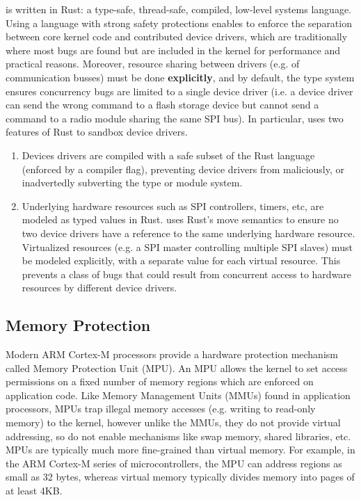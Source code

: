 \name is written in Rust: a type-safe, thread-safe, compiled, low-level systems
language. Using a language with strong safety protections enables \name to
enforce the separation between core kernel code and contributed device
drivers, which are traditionally where most bugs are found but are included in
the kernel for performance and practical reasons. Moreover, resource sharing
between drivers (e.g. of communication busses) must be done {\bf explicitly}, and
by default, the type system ensures concurrency bugs are limited to a single
device driver (i.e. a device driver can send the wrong command to a flash
storage device but cannot send a command to a radio module sharing the same SPI
bus). In particular, \name uses two features of Rust to sandbox device drivers.

\begin{enumerate}
  \item Devices drivers are compiled with a safe subset of the Rust language
  (enforced by a compiler flag), preventing device drivers from maliciously, or
  inadvertedly subverting the type or module system.

  \item Underlying hardware resources such as SPI controllers, timers, etc, are
    modeled as typed values in Rust. \name uses Rust's move semantics to ensure
    no two device drivers have a reference to the same underlying hardware
    resource. Virtualized resources (e.g. a SPI master controlling multiple SPI
    slaves) must be modeled explicitly, with a separate value for each virtual
    resource. This prevents a class of bugs that could result from concurrent
    access to hardware resources by different device drivers.

\end{enumerate} 

\subsection{Memory Protection}

Modern ARM Cortex-M processors provide a hardware protection mechanism called
Memory Protection Unit (MPU).  An MPU allows the kernel to set access
permissions on a fixed number of memory regions which are enforced on
application code. Like Memory Management Units (MMUs) found in application
processors, MPUs trap illegal memory accesses (e.g. writing to read-only memory)
to the kernel, however unlike the MMUs, they do not provide virtual addressing,
so do not enable mechanisms like swap memory, shared libraries, etc. MPUs are
typically much more fine-grained than virtual memory. For example, in the ARM
Cortex-M series of microcontrollers, the MPU can address regions as small as 32
bytes, whereas virtual memory typically divides memory into pages of at least
4KB.

